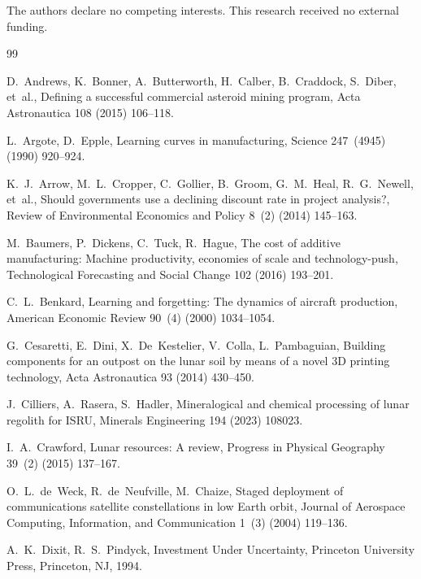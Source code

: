 \documentclass[preprint,12pt]{elsarticle}
\begin{document}
The authors declare no competing interests. This research received no external funding.

\begin{thebibliography}{99}

D.~Andrews, K.~Bonner, A.~Butterworth, H.~Calber, B.~Craddock, S.~Diber, et~al.,
\newblock Defining a successful commercial asteroid mining program,
\newblock Acta Astronautica 108 (2015) 106--118.

L.~Argote, D.~Epple,
\newblock Learning curves in manufacturing,
\newblock Science 247~(4945) (1990) 920--924.

K.~J.~Arrow, M.~L.~Cropper, C.~Gollier, B.~Groom, G.~M.~Heal, R.~G.~Newell, et~al.,
\newblock Should governments use a declining discount rate in project analysis?,
\newblock Review of Environmental Economics and Policy 8~(2) (2014) 145--163.

M.~Baumers, P.~Dickens, C.~Tuck, R.~Hague,
\newblock The cost of additive manufacturing: Machine productivity, economies of scale and technology-push,
\newblock Technological Forecasting and Social Change 102 (2016) 193--201.

C.~L.~Benkard,
\newblock Learning and forgetting: The dynamics of aircraft production,
\newblock American Economic Review 90~(4) (2000) 1034--1054.

G.~Cesaretti, E.~Dini, X.~De~Kestelier, V.~Colla, L.~Pambaguian,
\newblock Building components for an outpost on the lunar soil by means of a novel 3D printing technology,
\newblock Acta Astronautica 93 (2014) 430--450.

J.~Cilliers, A.~Rasera, S.~Hadler,
\newblock Mineralogical and chemical processing of lunar regolith for ISRU,
\newblock Minerals Engineering 194 (2023) 108023.

I.~A.~Crawford,
\newblock Lunar resources: A review,
\newblock Progress in Physical Geography 39~(2) (2015) 137--167.

O.~L.~de~Weck, R.~de~Neufville, M.~Chaize,
\newblock Staged deployment of communications satellite constellations in low Earth orbit,
\newblock Journal of Aerospace Computing, Information, and Communication 1~(3) (2004) 119--136.

A.~K.~Dixit, R.~S.~Pindyck,
\newblock Investment Under Uncertainty,
\newblock Princeton University Press, Princeton, NJ, 1994.


\end{thebibliography}
\end{document}
